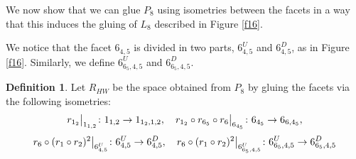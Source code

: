 \documentclass{amsart}
\theoremstyle{definition}
\newtheorem{defn}[lemma]{Definition}
\theoremstyle{remark}
\newcommand\restr[2]{{%
  \left.\kern-\nulldelimiterspace %
  #1 %
  \littletaller %
  \right|_{#2} %
  }}
\newcommand{\littletaller}{\mathchoice{\vphantom{\big|}}{}{}{}}
\begin{document}
We now show that we can glue $P_8$ using isometries between the facets in a way that this induces the gluing of $L_8$ described in Figure \ref{f16}.

We notice that the facet $6_{4,5}$ is divided in two parts, $6_{4,5}^U$ and $6_{4,5}^D$, as in Figure \ref{f16}. Similarly, we define $6_{6_5,4,5}^U$ and $6_{6_5,4,5}^D$.

\begin{defn}
    Let $R_{HW}$ be the space obtained from $P_8$ by gluing the facets via the following isometries:
    $$
        \restr{r_{1_2}}{1_{1,2}}\colon 1_{1,2}\rightarrow 1_{1_2,1,2}, \quad \restr{r_{1_2} \circ r_{6_5} \circ r_{6}}{6_{4_5}}\colon 6_{4_5}\rightarrow 6_{6,4_5},
    $$
    $$
        \restr{r_{6} \circ (r_1 \circ r_2)^2}{6_{4,5}^U}\colon 6_{4,5}^U\rightarrow 6_{4,5}^D, \quad
        \restr{r_{6} \circ (r_1 \circ r_2)^2}{6_{6_5,4,5}^U}\colon 6_{6_5,4,5}^U\rightarrow 6_{6_5,4,5}^D
    $$
\end{defn}

\end{document}
